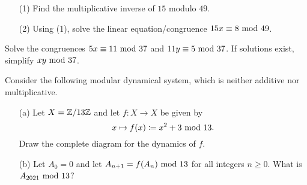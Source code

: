 \begin{problem}\label{Problem 9.1}\hfill
\begin{itemize}
\item[(1)] Find the multiplicative inverse of $15$ modulo $49$.
\item[(2)] Using (1), solve the linear equation/congruence $15x \equiv 8\text{ mod }{49}$.
\end{itemize}
\end{problem}

\vspace*{0.1in}

\begin{problem}\label{Problem 9.2}
Solve the congruences $5x \equiv 11\text{ mod }{37}$ and $11y \equiv 5\text{ mod }{37}$. If solutions exist, simplify $xy\text{ mod }{37}$.
\end{problem}

\vspace{0.1in}

\begin{problem}\label{Problem 9.3}
Consider the following modular dynamical system, which is neither additive nor multiplicative.
\begin{itemize}
\item[(a)] Let $X = \mathbb Z/13\mathbb Z$ and let $f : X \to X$ be given by
\[x \mapsto f(x) \coloneqq x^2 + 3 \text{ mod }{13}.\]
Draw the complete diagram for the dynamics of $f$.
\item[(b)] Let $A_0 = 0$ and let $A_{n+1} = f(A_n) \text{ mod }{13}$ for all integers $n \geq 0$. What is $A_{2021} \text{ mod }{13}$?
\end{itemize}
\end{problem}